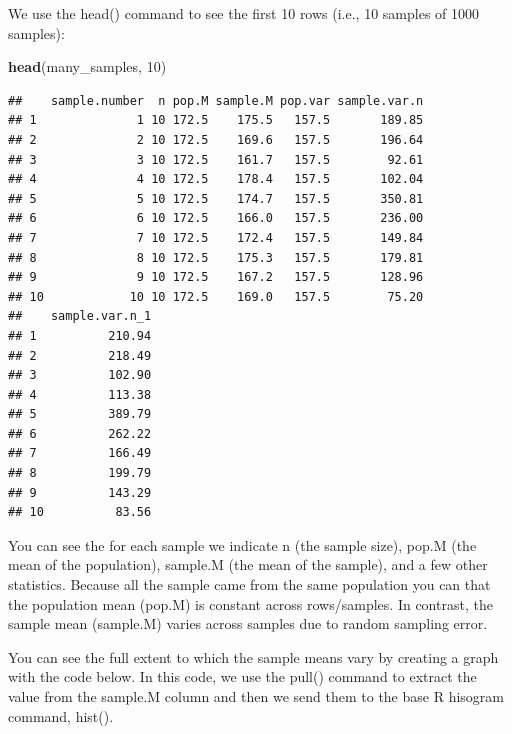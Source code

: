 \documentclass[
]{krantz}
\makeatletter
\newenvironment{Shaded}{\begin{snugshade}}{\end{snugshade}}
\newcommand{\DataTypeTok}[1]{\textcolor[rgb]{0.27,0.27,0.27}{#1}}
\newcommand{\DecValTok}[1]{\textcolor[rgb]{0.06,0.06,0.06}{#1}}
\newcommand{\KeywordTok}[1]{\textcolor[rgb]{0.27,0.27,0.27}{\textbf{#1}}}
\newcommand{\NormalTok}[1]{#1}
\newcommand{\OperatorTok}[1]{\textcolor[rgb]{0.43,0.43,0.43}{\textbf{#1}}}
\newcommand{\StringTok}[1]{\textcolor[rgb]{0.5,0.5,0.5}{#1}}
\newenvironment{kframe}{%
\medskip{}
\setlength{\fboxsep}{.8em}
 \def\at@end@of@kframe{}%
 \ifinner\ifhmode%
  \def\at@end@of@kframe{\end{minipage}}%
  \begin{minipage}{\columnwidth}%
 \fi\fi%
 \def\FrameCommand##1{\hskip\@totalleftmargin \hskip-\fboxsep
 \colorbox{shadecolor}{##1}\hskip-\fboxsep
     \hskip-\linewidth \hskip-\@totalleftmargin \hskip\columnwidth}%
 \MakeFramed {\advance\hsize-\width
   \@totalleftmargin\z@ \linewidth\hsize
   \@setminipage}}%
 {\par\unskip\endMakeFramed%
 \at@end@of@kframe}
\renewenvironment{Shaded}{\begin{kframe}}{\end{kframe}}
\makeatother
\begin{document}
We use the head() command to see the first 10 rows (i.e., 10 samples of 1000 samples):

\begin{Shaded}
\begin{Highlighting}[]
\KeywordTok{head}\NormalTok{(many_samples, }\DecValTok{10}\NormalTok{)}
\end{Highlighting}
\end{Shaded}

\begin{verbatim}
##    sample.number  n pop.M sample.M pop.var sample.var.n
## 1              1 10 172.5    175.5   157.5       189.85
## 2              2 10 172.5    169.6   157.5       196.64
## 3              3 10 172.5    161.7   157.5        92.61
## 4              4 10 172.5    178.4   157.5       102.04
## 5              5 10 172.5    174.7   157.5       350.81
## 6              6 10 172.5    166.0   157.5       236.00
## 7              7 10 172.5    172.4   157.5       149.84
## 8              8 10 172.5    175.3   157.5       179.81
## 9              9 10 172.5    167.2   157.5       128.96
## 10            10 10 172.5    169.0   157.5        75.20
##    sample.var.n_1
## 1          210.94
## 2          218.49
## 3          102.90
## 4          113.38
## 5          389.79
## 6          262.22
## 7          166.49
## 8          199.79
## 9          143.29
## 10          83.56
\end{verbatim}

You can see the for each sample we indicate n (the sample size), pop.M (the mean of the population), sample.M (the mean of the sample), and a few other statistics. Because all the sample came from the same population you can that the population mean (pop.M) is constant across rows/samples. In contrast, the sample mean (sample.M) varies across samples due to random sampling error.

You can see the full extent to which the sample means vary by creating a graph with the code below. In this code, we use the pull() command to extract the value from the sample.M column and then we send them to the base R hisogram command, hist().

\begin{Shaded}
\end{Shaded}
\end{document}
